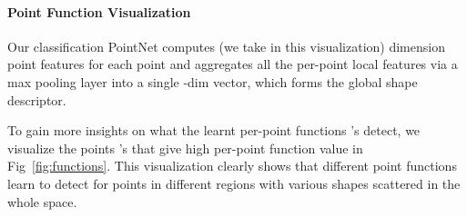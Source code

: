 \documentclass[10pt,twocolumn,letterpaper]{article}
\begin{document}
\paragraph{Point Function Visualization} Our classification PointNet computes  (we take  in this visualization) dimension point features for each point and aggregates all the per-point local features via a max pooling layer into a single -dim vector, which forms the global shape descriptor. 

To gain more insights on what the learnt per-point functions 's detect, we visualize the points 's that give high per-point function value  in Fig~\ref{fig:functions}. This visualization clearly shows that different point functions learn to detect for points in different regions with various shapes scattered in the whole space. 






%
 
\end{document}
